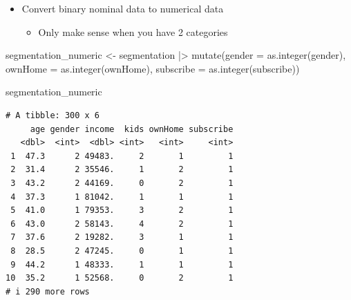 \documentclass[
  ignorenonframetext,
]{beamer}
\newenvironment{Shaded}{\begin{snugshade}}{\end{snugshade}}
\newcommand{\AttributeTok}[1]{\textcolor[rgb]{0.40,0.45,0.13}{#1}}
\newcommand{\FunctionTok}[1]{\textcolor[rgb]{0.28,0.35,0.67}{#1}}
\newcommand{\NormalTok}[1]{\textcolor[rgb]{0.00,0.23,0.31}{#1}}
\newcommand{\OtherTok}[1]{\textcolor[rgb]{0.00,0.23,0.31}{#1}}
\newcommand{\SpecialCharTok}[1]{\textcolor[rgb]{0.37,0.37,0.37}{#1}}
\providecommand{\tightlist}{%
  \setlength{\itemsep}{0pt}\setlength{\parskip}{0pt}}\usepackage{longtable,booktabs,array}
\begin{document}
\begin{frame}[fragile]{}
\label{section-46}
\begin{itemize}
\item
  Convert binary nominal data to numerical data

  \begin{itemize}
  \tightlist
  \item
    Only make sense when you have 2 categories
  \end{itemize}
\end{itemize}

\tiny

\begin{Shaded}
\begin{Highlighting}[]
\NormalTok{segmentation\_numeric }\OtherTok{\textless{}{-}}\NormalTok{ segmentation }\SpecialCharTok{|\textgreater{}} 
  \FunctionTok{mutate}\NormalTok{(}\AttributeTok{gender =} \FunctionTok{as.integer}\NormalTok{(gender),}
         \AttributeTok{ownHome =} \FunctionTok{as.integer}\NormalTok{(ownHome),}
         \AttributeTok{subscribe =} \FunctionTok{as.integer}\NormalTok{(subscribe))}

\NormalTok{segmentation\_numeric}
\end{Highlighting}
\end{Shaded}

\begin{verbatim}
# A tibble: 300 x 6
     age gender income  kids ownHome subscribe
   <dbl>  <int>  <dbl> <int>   <int>     <int>
 1  47.3      2 49483.     2       1         1
 2  31.4      2 35546.     1       2         1
 3  43.2      2 44169.     0       2         1
 4  37.3      1 81042.     1       1         1
 5  41.0      1 79353.     3       2         1
 6  43.0      2 58143.     4       2         1
 7  37.6      2 19282.     3       1         1
 8  28.5      2 47245.     0       1         1
 9  44.2      1 48333.     1       1         1
10  35.2      1 52568.     0       2         1
# i 290 more rows
\end{verbatim}
\end{frame}
\end{document}
